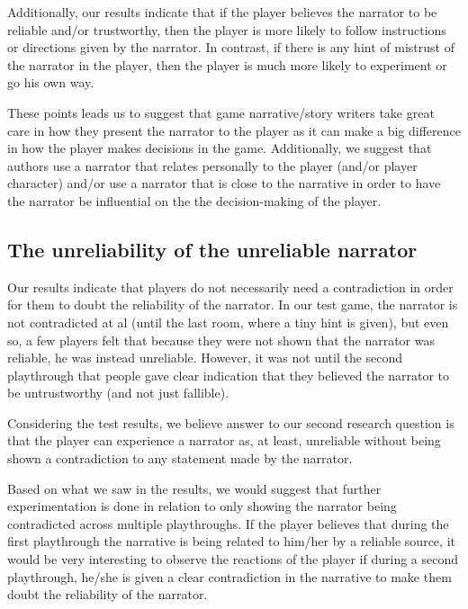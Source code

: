 Additionally, our results indicate that if the player believes the narrator to be reliable and/or trustworthy, then the player is more likely to follow instructions or directions given by the narrator. In contrast, if there is any hint of mistrust of the narrator in the player, then the player is much more likely to experiment or go his own way.

These points leads us to suggest that game narrative/story writers take great care in how they present the narrator to the player as it can make a big difference in how the player makes decisions in the game. Additionally, we suggest that authors use a narrator that relates personally to the player (and/or player character) and/or use a narrator that is close to the narrative in order to have the narrator be influential on the the decision-making of the player.
\subsection{The unreliability of the unreliable narrator}
Our results indicate that players do not necessarily need a contradiction in order for them to doubt the reliability of the narrator. In our test game, the narrator is not contradicted at al (until the last room, where a tiny hint is given), but even so, a few players felt that because they were not shown that the narrator was reliable, he was instead unreliable. However, it was not until the second playthrough that people gave clear indication that they believed the narrator to be untrustworthy (and not just fallible).

Considering the test results, we believe answer to our second research question is that the player can experience a narrator as, at least, unreliable without being shown a contradiction to any statement made by the narrator.

Based on what we saw in the results, we would suggest that further experimentation is done in relation to only showing the narrator being contradicted across multiple playthroughs. If the player believes that during the first playthrough the narrative is being related to him/her by a reliable source, it would be very interesting to observe the reactions of the player if during a second playthrough, he/she is given a clear contradiction in the narrative to make them doubt the reliability of the narrator.